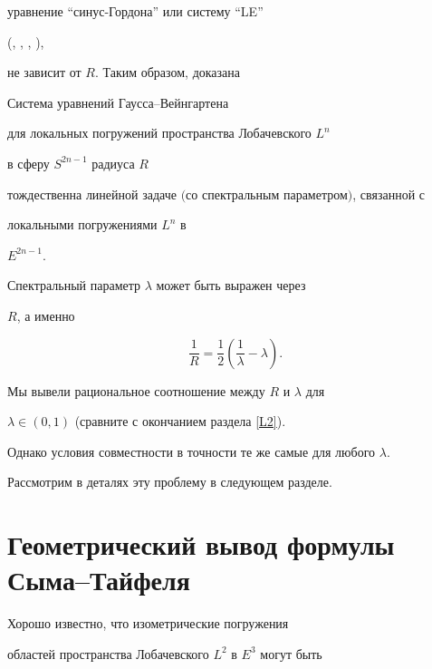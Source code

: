 уравнение ``синус-Гордона'' или систему ``LE''


(\cite{ABT}, \cite{CA}, \cite{Am88}, \cite{Am98}), 


не зависит от $R$. Таким образом, доказана 





\begin{thm}


Система уравнений Гаусса--Вейнгартена


для локальных погружений пространства Лобачевского $L^n$


в сферу $S^{2n-1}$ радиуса $R$


тождественна линейной задаче $($со спектральным параметром$)$, связанной с


локальными погружениями $L^n$ в


$E^{2n-1}$.


Спектральный параметр $\lambda$ может быть выражен через


$R$, а именно


$$


\frac{1}{R} = \frac{1}{2} \left( \frac{1}{\lambda} - \lambda \right).


$$


\end{thm}





Мы вывели рациональное соотношение между $R$ и $\lambda$ для


$\lambda \in (0,1)$ (сравните с окончанием раздела \ref{L2}).


Однако условия совместности в точности те же самые для любого $\lambda$.


Рассмотрим в деталях эту проблему в следующем разделе.








\section{Геометрический вывод формулы Сыма--Тайфеля}


\label{Symfor}





Хорошо известно, что изометрические погружения


областей пространства Лобачевского $L^2$ в $E^3$ могут быть


